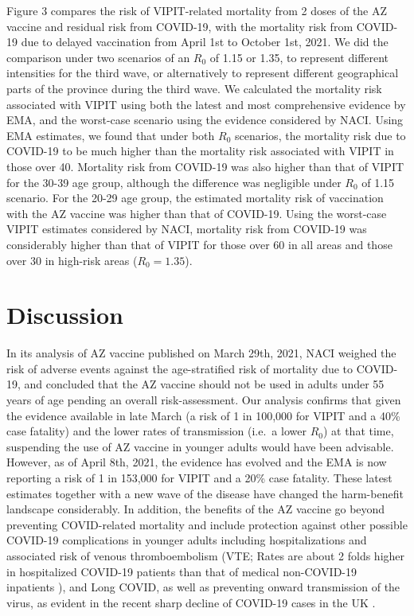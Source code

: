 \documentclass[]{interact}
\theoremstyle{plain}%
\theoremstyle{definition}
\theoremstyle{remark}
\begin{document}
Figure 3 compares the risk of VIPIT-related mortality from 2 doses of
the AZ vaccine and residual risk from COVID-19, with the mortality risk
from COVID-19 due to delayed vaccination from April 1st to October 1st,
2021. We did the comparison under two scenarios of an \(R_0\) of 1.15 or
1.35, to represent different intensities for the third wave, or
alternatively to represent different geographical parts of the province
during the third wave. We calculated the mortality risk associated with
VIPIT using both the latest and most comprehensive evidence by EMA, and
the worst-case scenario using the evidence considered by NACI. Using EMA
estimates, we found that under both \(R_0\) scenarios, the mortality
risk due to COVID-19 to be much higher than the mortality risk
associated with VIPIT in those over 40. Mortality risk from COVID-19 was
also higher than that of VIPIT for the 30-39 age group, although the
difference was negligible under \(R_0\) of 1.15 scenario. For the 20-29
age group, the estimated mortality risk of vaccination with the AZ
vaccine was higher than that of COVID-19. Using the worst-case VIPIT
estimates considered by NACI, mortality risk from COVID-19 was
considerably higher than that of VIPIT for those over 60 in all areas
and those over 30 in high-risk areas (\(R_0=1.35\)).

\hypertarget{discussion}{%
\section{Discussion}\label{discussion}}

In its analysis of AZ vaccine published on March 29th, 2021, NACI
weighed the risk of adverse events against the age-stratified risk of
mortality due to COVID-19, and concluded that the AZ vaccine should not
be used in adults under 55 years of age pending an overall
risk-assessment. Our analysis confirms that given the evidence available
in late March (a risk of 1 in 100,000 for VIPIT and a 40\% case
fatality) and the lower rates of transmission (i.e.~a lower \(R_0\)) at
that time, suspending the use of AZ vaccine in younger adults would have
been advisable. However, as of April 8th, 2021, the evidence has evolved
and the EMA is now reporting a risk of 1 in 153,000 for VIPIT and a 20\%
case fatality. These latest estimates together with a new wave of the
disease have changed the harm-benefit landscape considerably. In
addition, the benefits of the AZ vaccine go beyond preventing
COVID-related mortality and include protection against other possible
COVID-19 complications in younger adults including hospitalizations and
associated risk of venous thromboembolism (VTE; Rates are about 2 folds
higher in hospitalized COVID-19 patients than that of medical
non-COVID-19 inpatients \citep{alberta_health_services_covid-19_2021}),
and Long COVID, as well as preventing onward transmission of the virus,
as evident in the recent sharp decline of COVID-19 cases in the UK
\citep{govuk_official_2021}.
\end{document}
